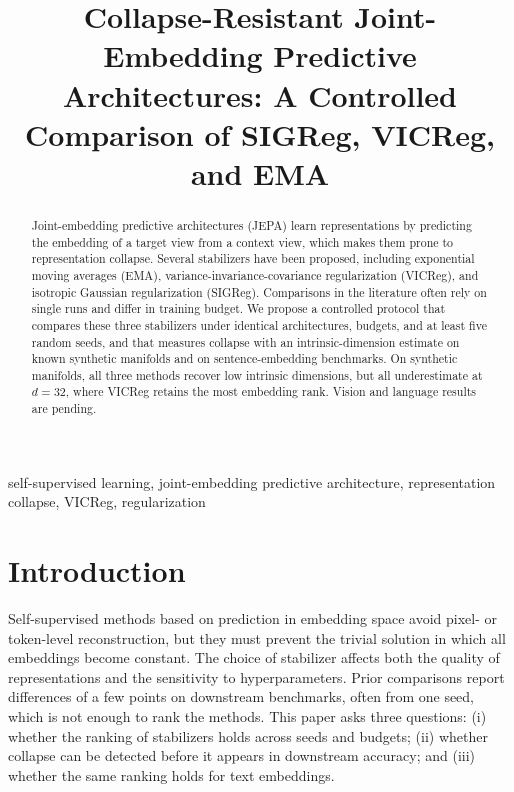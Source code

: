 \documentclass[conference]{IEEEtran}
\begin{document}
\title{Collapse-Resistant Joint-Embedding Predictive Architectures: A Controlled Comparison of SIGReg, VICReg, and EMA}

\author{
}

\maketitle

\begin{abstract}
Joint-embedding predictive architectures (JEPA) learn representations by predicting the embedding of a target view from a context view, which makes them prone to representation collapse. Several stabilizers have been proposed, including exponential moving averages (EMA), variance-invariance-covariance regularization (VICReg), and isotropic Gaussian regularization (SIGReg). Comparisons in the literature often rely on single runs and differ in training budget. We propose a controlled protocol that compares these three stabilizers under identical architectures, budgets, and at least five random seeds, and that measures collapse with an intrinsic-dimension estimate on known synthetic manifolds and on sentence-embedding benchmarks. On synthetic manifolds, all three methods recover low intrinsic dimensions, but all underestimate at $d=32$, where VICReg retains the most embedding rank. Vision and language results are pending.
\end{abstract}

\begin{IEEEkeywords}
self-supervised learning, joint-embedding predictive architecture, representation collapse, VICReg, regularization
\end{IEEEkeywords}

\section{Introduction}
Self-supervised methods based on prediction in embedding space avoid pixel- or token-level reconstruction, but they must prevent the trivial solution in which all embeddings become constant. The choice of stabilizer affects both the quality of representations and the sensitivity to hyperparameters. Prior comparisons report differences of a few points on downstream benchmarks, often from one seed, which is not enough to rank the methods. This paper asks three questions: (i) whether the ranking of stabilizers holds across seeds and budgets; (ii) whether collapse can be detected before it appears in downstream accuracy; and (iii) whether the same ranking holds for text embeddings.
\end{document}
